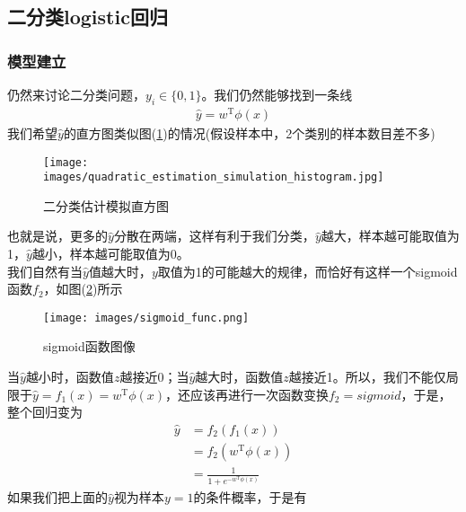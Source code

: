     \subsection{二分类logistic回归}
        \subsubsection{模型建立}
            \par
            仍然来讨论二分类问题，$y_i\in \{0,1\}$。我们仍然能够找到一条线
            \begin{align*}
            \hat{y} = w^\mathrm{T}\phi(x)
            \end{align*}
            我们希望$\hat{y}$的直方图类似图(\ref{fig:二分类估计模拟直方图})的情况(假设样本中，2个类别的样本数目差不多)
            \begin{figure}[H]
            \centering
            \texttt{[image: images/quadratic\_estimation\_simulation\_histogram.jpg]}
            \caption{二分类估计模拟直方图}
            \label{fig:二分类估计模拟直方图}
            \end{figure}
            也就是说，更多的$\hat{y}$分散在两端，这样有利于我们分类，$\hat{y}$越大，样本越可能取值为1，$\hat{y}$越小，样本越可能取值为0。\\
            我们自然有当$\hat{y}$值越大时，$y$取值为1的可能越大的规律，而恰好有这样一个sigmoid函数$f_2$，如图(\ref{fig:sigmoid函数图像})所示
           \begin{figure}[H]
           \centering
           \texttt{[image: images/sigmoid\_func.png]}
           \caption{sigmoid函数图像}
           \label{fig:sigmoid函数图像}
           \end{figure}
            当$\hat{y}$越小时，函数值$z$越接近0；当$\hat{y}$越大时，函数值$z$越接近1。所以，我们不能仅局限于$\hat{y} = f_1(x) = w^\mathrm{T}\phi(x)$，还应该再进行一次函数变换$f_2 = sigmoid$，于是，整个回归变为
            \begin{align*}
            \hat{y} &= f_2(f_1(x))\\
            &= f_2(w^\mathrm{T}\phi(x))\\
            &= \frac{1}{1+e^{-w^\mathrm{T}\phi(x)}}
            \end{align*}
            如果我们把上面的$\hat{y}$视为样本$y=1$的条件概率，于是有
